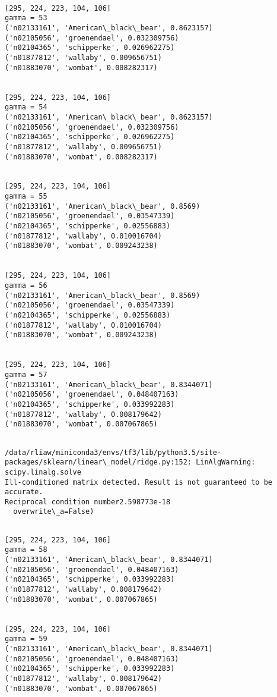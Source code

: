 \documentclass[11pt]{article}
\begin{document}
    \begin{Verbatim}[commandchars=\\\{\}]

[295, 224, 223, 104, 106]
gamma = 53
('n02133161', 'American\_black\_bear', 0.8623157)
('n02105056', 'groenendael', 0.032309756)
('n02104365', 'schipperke', 0.026962275)
('n01877812', 'wallaby', 0.009656751)
('n01883070', 'wombat', 0.008282317)


[295, 224, 223, 104, 106]
gamma = 54
('n02133161', 'American\_black\_bear', 0.8623157)
('n02105056', 'groenendael', 0.032309756)
('n02104365', 'schipperke', 0.026962275)
('n01877812', 'wallaby', 0.009656751)
('n01883070', 'wombat', 0.008282317)


[295, 224, 223, 104, 106]
gamma = 55
('n02133161', 'American\_black\_bear', 0.8569)
('n02105056', 'groenendael', 0.03547339)
('n02104365', 'schipperke', 0.02556883)
('n01877812', 'wallaby', 0.010016704)
('n01883070', 'wombat', 0.009243238)


[295, 224, 223, 104, 106]
gamma = 56
('n02133161', 'American\_black\_bear', 0.8569)
('n02105056', 'groenendael', 0.03547339)
('n02104365', 'schipperke', 0.02556883)
('n01877812', 'wallaby', 0.010016704)
('n01883070', 'wombat', 0.009243238)


[295, 224, 223, 104, 106]
gamma = 57
('n02133161', 'American\_black\_bear', 0.8344071)
('n02105056', 'groenendael', 0.048407163)
('n02104365', 'schipperke', 0.033992283)
('n01877812', 'wallaby', 0.008179642)
('n01883070', 'wombat', 0.007067865)


    \end{Verbatim}

    \begin{Verbatim}[commandchars=\\\{\}]
/data/rliaw/miniconda3/envs/tf3/lib/python3.5/site-packages/sklearn/linear\_model/ridge.py:152: LinAlgWarning: scipy.linalg.solve
Ill-conditioned matrix detected. Result is not guaranteed to be accurate.
Reciprocal condition number2.598773e-18
  overwrite\_a=False)

    \end{Verbatim}

    \begin{Verbatim}[commandchars=\\\{\}]

[295, 224, 223, 104, 106]
gamma = 58
('n02133161', 'American\_black\_bear', 0.8344071)
('n02105056', 'groenendael', 0.048407163)
('n02104365', 'schipperke', 0.033992283)
('n01877812', 'wallaby', 0.008179642)
('n01883070', 'wombat', 0.007067865)


[295, 224, 223, 104, 106]
gamma = 59
('n02133161', 'American\_black\_bear', 0.8344071)
('n02105056', 'groenendael', 0.048407163)
('n02104365', 'schipperke', 0.033992283)
('n01877812', 'wallaby', 0.008179642)
('n01883070', 'wombat', 0.007067865)


    \end{Verbatim}
\end{document}
